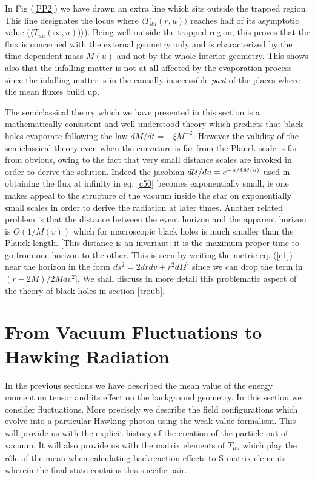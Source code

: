 \documentclass[12pt,oneside]{report}
\begin{document}
In Fig (\ref{PP2})
we have drawn an extra line which sits outside the trapped region.
This line designates the locus where $\langle
T_{uu}(r,u) \rangle$ reaches half of its asymptotic
value
 ($\langle T_{uu}(\infty,u)) \rangle$). 
Being well outside the trapped region, this proves that the flux 
is concerned with the external geometry only and is characterized
by the time dependent mass $M(u)$ and not by 
the whole interior geometry. This shows also
that the infalling matter is not at all affected by the evaporation process
since the infalling matter is in the causally inaccessible {\it{past}}
of the places
where the mean fluxes build up. 


The semiclassical theory which we have presented in this section is a
mathematically consistent and well understood theory which predicts that
black holes evaporate following the law $dM/dt = -\xi M^{-2}$. However the
validity of the semiclassical theory even when the curvature is far from the
Planck scale is far from obvious, owing to the fact that very small distance
scales are invoked in order to derive the solution. Indeed the
jacobian $d{\cal U} / du = e^{-u/ 4 M(u)}$ used in obtaining the flux
at infinity in eq. \ref{c50} becomes exponentially small, ie one makes appeal
to the structure of the vacuum inside the star on exponentially small scales in
order to derive the radiation at later times. Another related problem is
that the distance between the event horizon and the apparent horizon is
$O(1/M(v))$ which for  macroscopic black holes is much smaller than the Planck
length.  [This distance is an invariant: it is the 
maximum proper time to go from one horizon to
the other. This is seen by writing the metric 
eq. (\ref{c1}) near the horizon in the form $ds^2=
2drdv+r^2d\Omega^2$ since we can drop
the term in 
$(r-2M)/ 2M dv^2$]. We shall discuss in more detail this problematic aspect
of the theory of black holes in section \ref{troub}.



\section{From Vacuum Fluctuations  
to Hawking Radiation}
\label{VFHR}

In the previous sections we have described the mean 
value of the energy momentum tensor and its effect on the
background geometry.  In this section we consider 
fluctuations. More precisely we
describe the  field configurations which evolve into a
particular Hawking photon using the
weak value formalism. This will provide us with the explicit history 
of  the creation of the particle out of vacuum. It will also provide us with the matrix
elements of $T_{\mu\nu}$ which play the r\^ole of the mean when calculating backreaction
effects to S matrix elements wherein the final state contains this specific pair.
\end{document}
